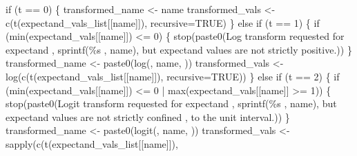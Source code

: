 \documentclass[
  letterpaper,
  DIV=11,
  numbers=noendperiod]{scrartcl}
\newenvironment{Shaded}{\begin{snugshade}}{\end{snugshade}}
\newcommand{\BuiltInTok}[1]{\textcolor[rgb]{0.00,0.23,0.31}{#1}}
\newcommand{\ControlFlowTok}[1]{\textcolor[rgb]{0.00,0.23,0.31}{#1}}
\newcommand{\DecValTok}[1]{\textcolor[rgb]{0.68,0.00,0.00}{#1}}
\newcommand{\NormalTok}[1]{\textcolor[rgb]{0.00,0.23,0.31}{#1}}
\newcommand{\OperatorTok}[1]{\textcolor[rgb]{0.37,0.37,0.37}{#1}}
\newcommand{\SpecialCharTok}[1]{\textcolor[rgb]{0.37,0.37,0.37}{#1}}
\newcommand{\StringTok}[1]{\textcolor[rgb]{0.13,0.47,0.30}{#1}}
\begin{document}
\begin{Shaded}
\begin{Highlighting}[]
  \ControlFlowTok{if}\NormalTok{ (t }\OperatorTok{==} \DecValTok{0}\NormalTok{) \{}
\NormalTok{    transformed\_name }\OperatorTok{\textless{}{-}}\NormalTok{ name}
\NormalTok{    transformed\_vals }\OperatorTok{\textless{}{-}}\NormalTok{ c(t(expectand\_vals\_list[[name]]),}
\NormalTok{                            recursive}\OperatorTok{=}\NormalTok{TRUE)}
\NormalTok{  \} }\ControlFlowTok{else} \ControlFlowTok{if}\NormalTok{ (t }\OperatorTok{==} \DecValTok{1}\NormalTok{) \{}
    \ControlFlowTok{if}\NormalTok{ (}\BuiltInTok{min}\NormalTok{(expectand\_vals[[name]]) }\OperatorTok{\textless{}=} \DecValTok{0}\NormalTok{) \{}
\NormalTok{      stop(paste0(}\StringTok{\textquotesingle{}Log transform requested for expectand \textquotesingle{}}\NormalTok{,}
\NormalTok{                  sprintf(}\StringTok{\textquotesingle{}}\SpecialCharTok{\%s}\StringTok{ \textquotesingle{}}\NormalTok{, name),}
                  \StringTok{\textquotesingle{}but expectand values are not strictly positive.\textquotesingle{}}\NormalTok{))}
\NormalTok{    \}}
\NormalTok{    transformed\_name }\OperatorTok{\textless{}{-}}\NormalTok{ paste0(}\StringTok{\textquotesingle{}log(\textquotesingle{}}\NormalTok{, name, }\StringTok{\textquotesingle{})\textquotesingle{}}\NormalTok{)}
\NormalTok{    transformed\_vals }\OperatorTok{\textless{}{-}}\NormalTok{ log(c(t(expectand\_vals\_list[[name]]),}
\NormalTok{                              recursive}\OperatorTok{=}\NormalTok{TRUE))}
\NormalTok{  \} }\ControlFlowTok{else} \ControlFlowTok{if}\NormalTok{ (t }\OperatorTok{==} \DecValTok{2}\NormalTok{) \{}
    \ControlFlowTok{if}\NormalTok{ (}\BuiltInTok{min}\NormalTok{(expectand\_vals[[name]]) }\OperatorTok{\textless{}=} \DecValTok{0} \OperatorTok{|}
        \BuiltInTok{max}\NormalTok{(expectand\_vals[[name]] }\OperatorTok{\textgreater{}=} \DecValTok{1}\NormalTok{)) \{}
\NormalTok{      stop(paste0(}\StringTok{\textquotesingle{}Logit transform requested for expectand \textquotesingle{}}\NormalTok{,}
\NormalTok{                  sprintf(}\StringTok{\textquotesingle{}}\SpecialCharTok{\%s}\StringTok{ \textquotesingle{}}\NormalTok{ , name),}
                  \StringTok{\textquotesingle{}but expectand values are not strictly confined \textquotesingle{}}\NormalTok{,}
                  \StringTok{\textquotesingle{}to the unit interval.\textquotesingle{}}\NormalTok{))}
\NormalTok{    \}}
\NormalTok{    transformed\_name }\OperatorTok{\textless{}{-}}\NormalTok{ paste0(}\StringTok{\textquotesingle{}logit(\textquotesingle{}}\NormalTok{, name, }\StringTok{\textquotesingle{})\textquotesingle{}}\NormalTok{)}
\NormalTok{    transformed\_vals }\OperatorTok{\textless{}{-}}\NormalTok{ sapply(c(t(expectand\_vals\_list[[name]]),}

\end{Highlighting}
\end{Shaded}
\end{document}
